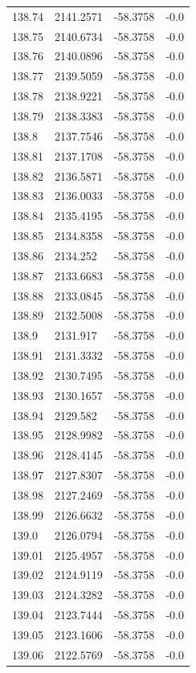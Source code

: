 \begin{table}[H]
\begin{tabular}{llll}
138.74 & 2141.2571 & -58.3758 & -0.0 \\
138.75 & 2140.6734 & -58.3758 & -0.0 \\
138.76 & 2140.0896 & -58.3758 & -0.0 \\
138.77 & 2139.5059 & -58.3758 & -0.0 \\
138.78 & 2138.9221 & -58.3758 & -0.0 \\
138.79 & 2138.3383 & -58.3758 & -0.0 \\
138.8 & 2137.7546 & -58.3758 & -0.0 \\
138.81 & 2137.1708 & -58.3758 & -0.0 \\
138.82 & 2136.5871 & -58.3758 & -0.0 \\
138.83 & 2136.0033 & -58.3758 & -0.0 \\
138.84 & 2135.4195 & -58.3758 & -0.0 \\
138.85 & 2134.8358 & -58.3758 & -0.0 \\
138.86 & 2134.252 & -58.3758 & -0.0 \\
138.87 & 2133.6683 & -58.3758 & -0.0 \\
138.88 & 2133.0845 & -58.3758 & -0.0 \\
138.89 & 2132.5008 & -58.3758 & -0.0 \\
138.9 & 2131.917 & -58.3758 & -0.0 \\
138.91 & 2131.3332 & -58.3758 & -0.0 \\
138.92 & 2130.7495 & -58.3758 & -0.0 \\
138.93 & 2130.1657 & -58.3758 & -0.0 \\
138.94 & 2129.582 & -58.3758 & -0.0 \\
138.95 & 2128.9982 & -58.3758 & -0.0 \\
138.96 & 2128.4145 & -58.3758 & -0.0 \\
138.97 & 2127.8307 & -58.3758 & -0.0 \\
138.98 & 2127.2469 & -58.3758 & -0.0 \\
138.99 & 2126.6632 & -58.3758 & -0.0 \\
139.0 & 2126.0794 & -58.3758 & -0.0 \\
139.01 & 2125.4957 & -58.3758 & -0.0 \\
139.02 & 2124.9119 & -58.3758 & -0.0 \\
139.03 & 2124.3282 & -58.3758 & -0.0 \\
139.04 & 2123.7444 & -58.3758 & -0.0 \\
139.05 & 2123.1606 & -58.3758 & -0.0 \\
139.06 & 2122.5769 & -58.3758 & -0.0 \\

\end{tabular}
\end{table}
